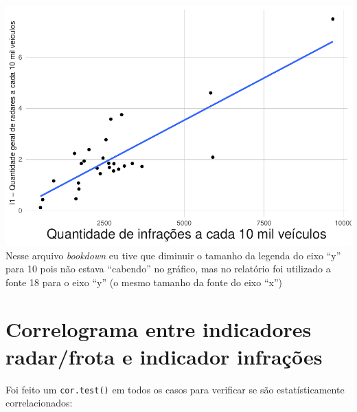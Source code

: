 \documentclass[
]{book}
\begin{document}
\includegraphics{_main_files/figure-latex/unnamed-chunk-24-1.pdf}
Nesse arquivo \emph{bookdown} eu tive que diminuir o tamanho da legenda do eixo ``y'' para 10 pois não estava ``cabendo'' no gráfico, mas no relatório foi utilizado a fonte 18 para o eixo ``y'' (o mesmo tamanho da fonte do eixo ``x'')

\section{Correlograma entre indicadores radar/frota e indicador infrações}\label{correlograma-entre-indicadores-radarfrota-e-indicador-infrauxe7uxf5es}

Foi feito um \texttt{cor.test()} em todos os casos para verificar se são estatísticamente correlacionados:
\end{document}
